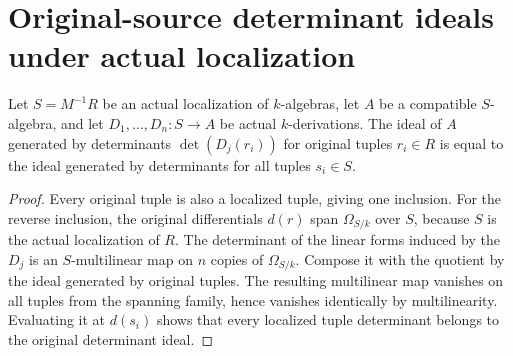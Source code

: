 \section{Original-source determinant ideals under actual localization}

\begin{theorem}\label{thm:sc0-derivation-source-localization}
\leanok
{}
Let $S=M^{-1}R$ be an actual localization of $k$-algebras, let $A$ be a
compatible $S$-algebra, and let $D_1,\ldots,D_n:S\to A$ be actual
$k$-derivations. The ideal of $A$ generated by determinants
$\det(D_j(r_i))$ for original tuples $r_i\in R$ is equal to the ideal
generated by determinants for all tuples $s_i\in S$.
\end{theorem}
\begin{proof}
Every original tuple is also a localized tuple, giving one inclusion.
For the reverse inclusion, the original differentials
$d(r)$ span $\Omega_{S/k}$ over $S$, because $S$ is the actual
localization of $R$. The determinant of the linear forms induced by
the $D_j$ is an $S$-multilinear map on $n$ copies of
$\Omega_{S/k}$. Compose it with the quotient by the ideal generated
by original tuples. The resulting multilinear map vanishes on all
tuples from the spanning family, hence vanishes identically by
multilinearity. Evaluating it at $d(s_i)$ shows that every localized
tuple determinant belongs to the original determinant ideal.
\end{proof}
